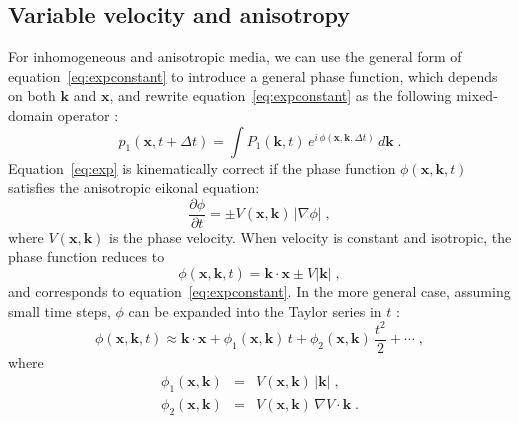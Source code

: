 \subsection{Variable velocity and anisotropy}
For inhomogeneous and anisotropic media, we can use the general form of equation~\ref{eq:expconstant} to introduce a general phase function, which depends on both $\mathbf{k}$ and $\mathbf{x}$, and rewrite equation~\ref{eq:expconstant} as the following mixed-domain operator \cite[]{wards,lowrank}:
\begin{equation}
  \label{eq:exp}
  p_1(\mathbf{x},t+\Delta t) = \int
  P_1(\mathbf{k},t)\,e^{i\,\phi(\mathbf{x},\mathbf{k},\Delta t)}\,d\mathbf{k}\;.
\end{equation}
Equation~\ref{eq:exp} is kinematically correct if the phase function $\phi(\mathbf{x},\mathbf{k},t)$ satisfies the anisotropic eikonal equation:
\begin{equation}
  \label{eq:eiko}
  \frac{\partial \phi}{\partial t} = \pm V(\mathbf{x},\mathbf{k})\,\left|\nabla \phi\right|\;,
\end{equation}
where $V(\mathbf{x},\mathbf{k})$ is the phase velocity. When velocity is constant and isotropic, the phase function reduces to 
\begin{equation}
  \label{eq:reduce}
\phi(\mathbf{x},\mathbf{k},t) =  \mathbf{k} \cdot \mathbf{x} \pm V|\mathbf{k}| \; ,
\end{equation}
and corresponds to equation~\ref{eq:expconstant}. In the more general case, assuming small time steps, $\phi$ can be expanded into the Taylor series in $t$ \cite[]{lowrank}:
\begin{equation}
  \label{eq:taylor}
  \phi(\mathbf{x},\mathbf{k},t) \approx  \mathbf{k} \cdot \mathbf{x} + \phi_1(\mathbf{x},\mathbf{k})\,t + \phi_2(\mathbf{x},\mathbf{k})\,\frac{t^2}{2} + \cdots \; ,
\end{equation}
where
\begin{eqnarray}
  \label{eq:phi1}
  \phi_1(\mathbf{x},\mathbf{k}) & = & V(\mathbf{x},\mathbf{k})\,|\mathbf{k}|\;, \\
  \label{eq:phi2}
  \phi_2(\mathbf{x},\mathbf{k}) & = & V(\mathbf{x},\mathbf{k})\,\nabla V \cdot \mathbf{k}\;.
\end{eqnarray}


